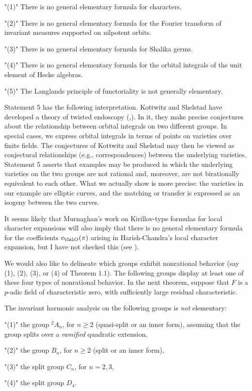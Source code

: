 \bigbreak
{}
\roster
\item"(1)"
There is no general elementary formula for characters.
\item"(2)"
There is no general elementary formula for the Fourier transform of 
invariant measures supported on nilpotent
orbits.
\item"(3)"
There is no general elementary formula for Shalika germs.
\item"(4)"
There is no general elementary formula for the orbital integrals of the
unit element of Hecke algebras.
\item"(5)"
The Langlands principle of functoriality
 is not generally elementary. 
\endroster
\endproclaim

Statement 5 has the
following interpretation.  Kottwitz and Shelstad have developed
a theory of twisted endoscopy (\cite{KS1},\cite{KS2}).  In it,
 they make precise conjectures
about the relationship between orbital integrals on two different groups.
In special cases, we express orbital integrals in terms of points on varieties
over finite fields.  The conjectures of Kottwitz and Shelstad may
then be viewed as conjectural relationships (e.g., correspondences) between
the underlying varieties.   Statement 5 asserts that examples may be
produced in which the underlying
varieties on the two groups are not rational and, moreover, are not
birationally equivalent to each other.  What we actually show is more
precise: the varieties in our example are elliptic curves, and the
matching or transfer is expressed as an isogeny between the two
curves.

It seems likely that Murnaghan's work on Kirillov-type formulas for
local character expansions will also imply that there is no general
elementary formula for the coefficients $c_{\O}(\pi)$ arising
in Harish-Chandra's local character expansion, but I have not
checked this (see \cite{M2}).

We would also like to delineate which groups exhibit 
nonrational behavior (say (1), (2), (3), or (4) of Theorem 1.1).  
The following
groups display at least one of these four types of
nonrational behavior.  In the next theorem, 
suppose that $F$ is a $p$-adic field
of characteristic zero, with sufficiently large residual characteristic.


The invariant harmonic analysis
on the following groups is {\it not} elementary:
\roster
\item"(1)"
the group ${}^2\! A_n$, for $n\ge 2$ 
     (quasi-split or an inner form),
    assuming that
the group splits over a {\it ramified} quadratic extension,
\item"(2)"
   the group $B_n$, for $n\ge 2$
    (split or an inner form),
\item"(3)"
   the split group $C_n$, for $n=2,3$, 
\item"(4)"
  the split group $D_4$. 
\endroster
\endproclaim

